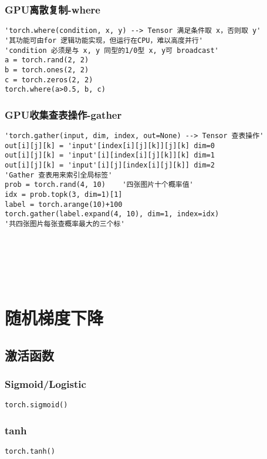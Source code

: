 \subsubsection{GPU离散复制-where}
\begin{lstlisting}
'torch.where(condition, x, y) --> Tensor 满足条件取 x，否则取 y'
'其功能可由for 逻辑功能实现，但运行在CPU，难以高度并行'
'condition 必须是与 x, y 同型的1/0型 x, y可 broadcast'
a = torch.rand(2, 2)
b = torch.ones(2, 2)
c = torch.zeros(2, 2)
torch.where(a>0.5, b, c)
\end{lstlisting}

\subsubsection{GPU收集查表操作-gather}
\begin{lstlisting}
'torch.gather(input, dim, index, out=None) --> Tensor 查表操作'
out[i][j][k] = 'input'[index[i][j][k]][j][k] dim=0
out[i][j][k] = 'input'[i][index[i][j][k]][k] dim=1
out[i][j][k] = 'input'[i][j][index[i][j][k]] dim=2
'Gather 查表用来索引全局标签'
prob = torch.rand(4, 10)    '四张图片十个概率值'
idx = prob.topk(3, dim=1)[1]
label = torch.arange(10)+100
torch.gather(label.expand(4, 10), dim=1, index=idx)
'共四张图片每张查概率最大的三个标'
\end{lstlisting}
~\\
~\\
~\\
~\\




\newpage
\section{随机梯度下降}
\subsection{激活函数}
\subsubsection{Sigmoid/Logistic}
\begin{lstlisting}
torch.sigmoid()
\end{lstlisting}

\subsubsection{tanh}
\begin{lstlisting}
torch.tanh()
\end{lstlisting}

